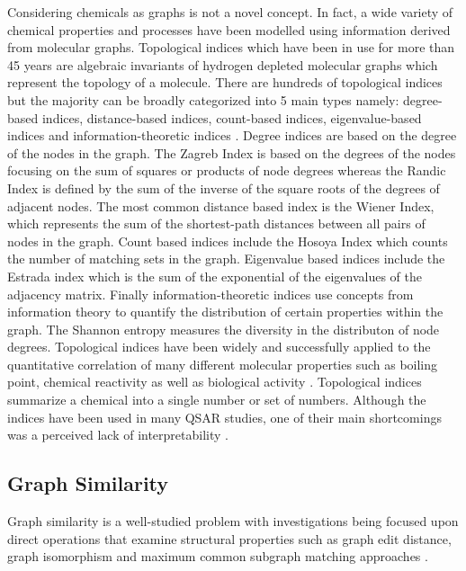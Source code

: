\documentclass[
  super,
  preprint,
  3p]{elsarticle}
\begin{document}
Considering chemicals as graphs is not a novel concept. In fact, a wide
variety of chemical properties and processes have been modelled using
information derived from molecular graphs. Topological indices which
have been in use for more than 45 years are algebraic invariants of
hydrogen depleted molecular graphs which represent the topology of a
molecule. There are hundreds of topological indices but the majority can
be broadly categorized into 5 main types namely: degree-based indices,
distance-based indices, count-based indices, eigenvalue-based indices
and information-theoretic indices \citep{balaban_topological_1983}.
Degree indices are based on the degree of the nodes in the graph. The
Zagreb Index is based on the degrees of the nodes focusing on the sum of
squares or products of node degrees whereas the Randic Index is defined
by the sum of the inverse of the square roots of the degrees of adjacent
nodes. The most common distance based index is the Wiener Index, which
represents the sum of the shortest-path distances between all pairs of
nodes in the graph. Count based indices include the Hosoya Index which
counts the number of matching sets in the graph. Eigenvalue based
indices include the Estrada index which is the sum of the exponential of
the eigenvalues of the adjacency matrix. Finally information-theoretic
indices use concepts from information theory to quantify the
distribution of certain properties within the graph. The Shannon entropy
measures the diversity in the distributon of node degrees. Topological
indices have been widely and successfully applied to the quantitative
correlation of many different molecular properties such as boiling
point, chemical reactivity as well as biological activity
\citep{roy_use_2017}. Topological indices summarize a chemical into a
single number or set of numbers. Although the indices have been used in
many QSAR studies, one of their main shortcomings was a perceived lack
of interpretability \citep{todeschini_chemical_1992}.

\subsection{Graph Similarity}\label{graph-similarity}

Graph similarity is a well-studied problem with investigations being
focused upon direct operations that examine structural properties such
as graph edit distance, graph isomorphism and maximum common subgraph
matching approaches
\citep{ullmann_algorithm_1976, pelillo_replicator_1999, melnik_similarity_2002, jeh_simrank_2002, zager_graph_2008, koutra_algorithms_2011, chartrand_graph_1998}.
\end{document}
